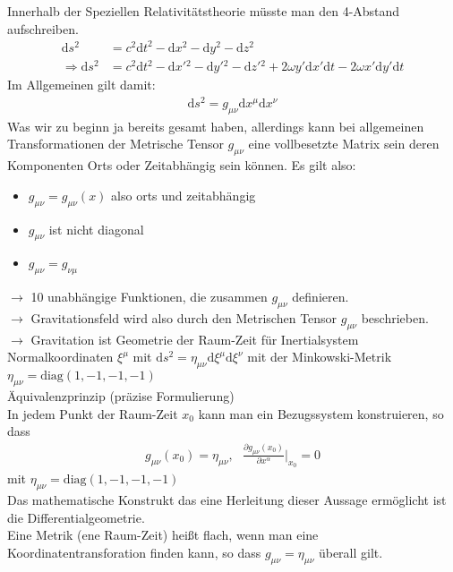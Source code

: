 \documentclass[a4paper]{article}
\begin{document}
Innerhalb der Speziellen Relativitätstheorie müsste man den 4-Abstand
aufschreiben. 
\begin{align}
\mathrm{d}s^2&=c^2\mathrm{d}t^2-\mathrm{d}x^2-\mathrm{d}y^2-\mathrm{d}z^2\\
\Rightarrow
\mathrm{d}s^2&=c^2\mathrm{d}t^2-\mathrm{d}x'{}^2-\mathrm{d}y'{}^2-
\mathrm{d}z'{}^2+2\omega y'\mathrm{d}x'\mathrm{d}t -2\omega x'
\mathrm{d}y'\mathrm{d}t
\end{align}
Im Allgemeinen gilt damit:
\begin{align}
\mathrm{d}s^2=g_{\mu\nu}\mathrm{d}x^\mu\mathrm{d}x^\nu
\end{align}
Was wir zu beginn ja bereits gesamt haben, allerdings kann bei allgemeinen
Transformationen der Metrische Tensor $g_{\mu\nu}$ eine vollbesetzte Matrix sein
deren Komponenten Orts oder Zeitabhängig sein können. Es gilt also:
\begin{itemize}
  \item $g_{\mu\nu}=g_{\mu\nu}(x)$ also orts und zeitabhängig
  \item $g_{\mu\nu}$ ist nicht diagonal
  \item $g_{\mu\nu}=g_{\nu\mu}$
\end{itemize}
$\rightarrow$ 10 unabhängige Funktionen, die zusammen $g_{\mu\nu}$ definieren.\\
$\rightarrow$ Gravitationsfeld wird also durch den Metrischen Tensor
$g_{\mu\nu}$ beschrieben.\\
$\rightarrow$ Gravitation ist Geometrie der Raum-Zeit
für Inertialsystem\\
Normalkoordinaten $\xi^\mu$ mit $\mathrm{d}s^2=\eta_{\mu\nu}\mathrm{d}
\xi^\mu\mathrm{d}\xi^\nu$ mit der Minkowski-Metrik
$\eta_{\mu\nu}=\text{diag}(1,-1,-1,-1)$\\
Äquivalenzprinzip (präzise Formulierung)\\
In jedem Punkt der Raum-Zeit $x_0$ kann man ein Bezugssystem konstruieren, so
dass
\begin{align}
g_{\mu\nu}(x_0)=\eta_{\mu\nu}, \ \ \ \frac{\partial g_{\mu\nu}(x_0)}{\partial
x^\alpha}\Big|_{x_0}=0
\end{align}
mit $\eta_{\mu\nu}=\text{diag}(1,-1,-1,-1)$\\
Das mathematische Konstrukt das eine Herleitung dieser Aussage ermöglicht ist
die Differentialgeometrie.\\
Eine Metrik (ene Raum-Zeit) heißt flach, wenn man eine Koordinatentransforation
finden kann, so dass $g_{\mu\nu}=\eta_{\mu\nu}$ überall gilt.\\
\end{document}
